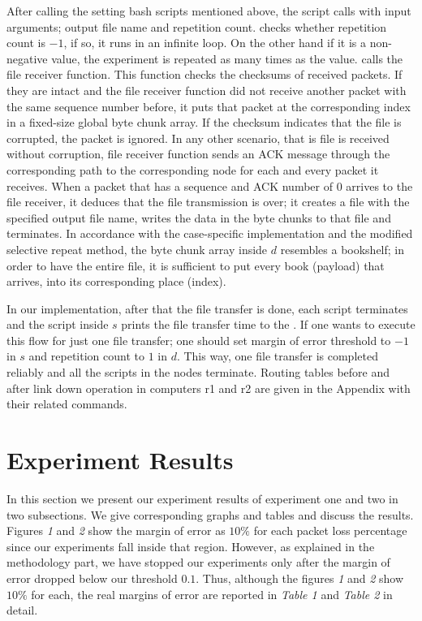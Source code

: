 \documentclass[conference]{IEEEtran}
\begin{document}
    After calling the setting bash scripts mentioned above, the  script calls  with input arguments; output file name and repetition count.  checks whether repetition count is $-1$, if so, it runs in an infinite loop. On the other hand if it is a non-negative value, the experiment is repeated as many times as the value.  calls the file receiver function. This function checks the checksums of received packets. If they are intact and the file receiver function did not receive another packet with the same sequence number before, it puts that packet at the corresponding index in a fixed-size global byte chunk array. If the checksum indicates that the file is corrupted, the packet is ignored. In any other scenario, that is file is received without corruption, file receiver function sends an ACK message through the corresponding path to the corresponding node for each and every packet it receives. When a packet that has a sequence and ACK number of $0$ arrives to the file receiver, it deduces that the file transmission is over; it creates a file with the specified output file name, writes the data in the byte chunks to that file and terminates. In accordance with the case-specific implementation and the modified selective repeat method, the byte chunk array inside $d$ resembles a bookshelf; in order to have the entire file, it is sufficient to put every book (payload) that arrives, into its corresponding place (index). 
    
    In our implementation, after that the file transfer is done, each script terminates and the script inside $s$ prints the file transfer time to the . If one wants to execute this flow for just one file transfer; one should set margin of error threshold to $-1$ in $s$ and repetition count to $1$ in $d$. This way, one file transfer is completed reliably and all the scripts in the nodes terminate. Routing tables before and after link down operation in computers r1 and r2 are given in the Appendix with their related commands.


\section{Experiment Results}

     In this section we present our experiment results of experiment one and two in two subsections. We give corresponding graphs and tables and discuss the results. Figures \textit{1} and \textit{2} show the margin of error as $10\%$ for each packet loss percentage since our experiments fall inside that region. However, as explained in the methodology part, we have stopped our experiments only after the margin of error dropped below our threshold $0.1$. Thus, although the figures \textit{1} and \textit{2} show $10\%$ for each, the real margins of error are reported in \textit{Table 1} and \textit{Table 2} in detail.
\end{document}
